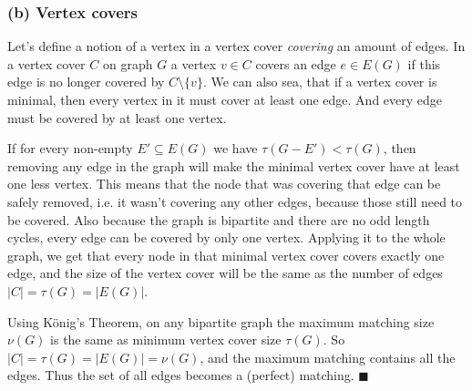 \documentclass{article}
\begin{document}


  \subsubsection*{(b) Vertex covers}
  Let's define a notion of a vertex in a vertex cover \textit{covering} an amount of edges.
  In a vertex cover $C$ on graph $G$ a vertex $v \in C$ covers an edge $e \in E(G)$
  if this edge is no longer covered by $C \setminus \{v\}$.
  We can also sea, that if a vertex cover is minimal, then every vertex in it must cover at least one edge.
  And every edge must be covered by at least one vertex.

  If for every non-empty $E' \subseteq E(G)$ we have $\tau(G - E') < \tau(G)$,
  then removing any edge in the graph will make the minimal vertex cover have at least one less vertex.
  This means that the node that was covering that edge can be safely removed,
  i.e. it wasn't covering any other edges, because those still need to be covered.
  Also because the graph is bipartite and there are no odd length cycles, every edge can be covered by only one vertex.
  Applying it to the whole graph, we get that every node in that minimal vertex cover covers exactly one edge,
  and the size of the vertex cover will be the same as the number of edges $|C| = \tau(G) = |E(G)|$.

  Using König's Theorem, on any bipartite graph the maximum matching size $\nu(G)$ is the same as minimum vertex cover size $\tau(G)$.
  So $|C| = \tau(G) = |E(G)| = \nu(G)$, and the maximum matching contains all the edges.
  Thus the set of all edges becomes a (perfect) matching.
  $\blacksquare$

\end{document}

